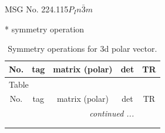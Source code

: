 \documentclass[fleqn,8pt]{jsarticle}
\begin{document}
\setcounter{MaxMatrixCols}{32}

\renewcommand{\tablename}{Table~}
\renewcommand{\figurename}{Figure~}
\begin{center}
\LARGE
MSG No. 224.115\quad$P_{I}n\bar{3}m$
\end{center}
* symmetry operation
\renewcommand{\arraystretch}{1.3}
\begin{longtable}{ccccc}
\caption{Symmetry operations for 3d polar vector.}
 \\
 \hline \hline
No. & tag & matrix (polar) & det & TR \\ \hline \endfirsthead

\multicolumn{4}{l}{\tablename\ \thetable{}} \\
 \hline \hline
No. & tag & matrix (polar) & det & TR \\ \hline \endhead

 \hline \hline
\multicolumn{4}{r}{\footnotesize\it continued ...} \\ \endfoot

 \hline \hline
\multicolumn{4}{r}{} \\ \endlastfoot


\end{longtable}
\end{document}
